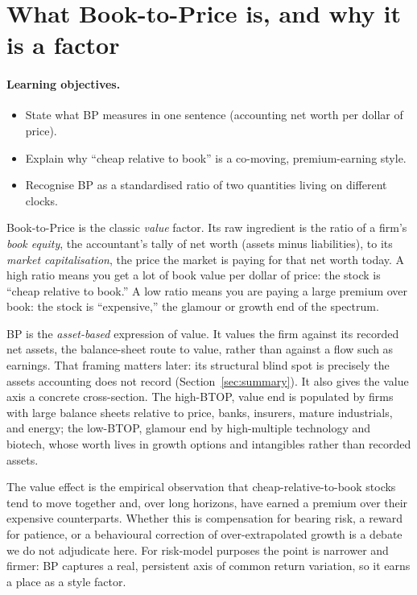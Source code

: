 \documentclass[11pt]{article}
\theoremstyle{definition}
\theoremstyle{plain}
\theoremstyle{remark}
\begin{document}
\tableofcontents
\bigskip

\section{What Book-to-Price is, and why it is a factor}\label{sec:what}

\paragraph{Learning objectives.}
\begin{itemize}[leftmargin=1.4em,nosep]
  \item State what BP measures in one sentence (accounting net worth per dollar of price).
  \item Explain why ``cheap relative to book'' is a co-moving, premium-earning style.
  \item Recognise BP as a standardised ratio of two quantities living on different clocks.
\end{itemize}

Book-to-Price is the classic \emph{value} factor. Its raw ingredient is the ratio of a firm's \emph{book equity}, the accountant's tally of net worth (assets minus liabilities), to its \emph{market capitalisation}, the price the market is paying for that net worth today. A high ratio means you get a lot of book value per dollar of price: the stock is ``cheap relative to book.'' A low ratio means you are paying a large premium over book: the stock is ``expensive,'' the glamour or growth end of the spectrum.

BP is the \emph{asset-based} expression of value. It values the firm against its recorded net assets, the balance-sheet route to value, rather than against a flow such as earnings. That framing matters later: its structural blind spot is precisely the assets accounting does not record (Section~\ref{sec:summary}). It also gives the value axis a concrete cross-section. The high-BTOP, value end is populated by firms with large balance sheets relative to price, banks, insurers, mature industrials, and energy; the low-BTOP, glamour end by high-multiple technology and biotech, whose worth lives in growth options and intangibles rather than recorded assets.

The value effect is the empirical observation that cheap-relative-to-book stocks tend to move together and, over long horizons, have earned a premium over their expensive counterparts. Whether this is compensation for bearing risk, a reward for patience, or a behavioural correction of over-extrapolated growth is a debate we do not adjudicate here. For risk-model purposes the point is narrower and firmer: BP captures a real, persistent axis of common return variation, so it earns a place as a style factor.
\end{document}
